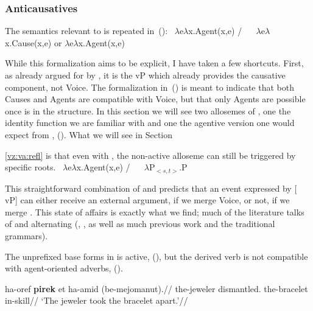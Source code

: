 		\subsubsection{Anticausatives} \label{vz:va:easy:anticaus}
The semantics relevant to {\va} is repeated in~(\nextx):
\pex\label{ex:vz:denote-va}
	\a {} \lra~$\lambda$e$\lambda$x.Agent(x,e) / \trace~\va
	\a {} \lra~$\lambda$e$\lambda$x.Cause(x,e) or $\lambda$e$\lambda$x.Agent(x,e)
\xe

While this formalization aims to be explicit, I have taken a few shortcuts. First, as already argued for by \cite{layering15}, it is the vP which already provides the causative component, not Voice. The formalization in~(\lastx) is meant to indicate that both Causes and Agents are compatible with Voice, but that only Agents are possible once {\va} is in the structure. In this section we will see two allosemes of {\vz}, one the identity function we are familiar with and one the agentive version one would expect from {\va}, (\nextx). What we will see in Section~{\ref{vz:va:refl} is that even with {\va}, the non-active alloseme can still be triggered by specific roots.
\pex 
	\a \denote{\vz} \lra~$\lambda$e$\lambda$x.Agent(x,e) / \trace~\va
	\a \denote{\vz} \lra~$\lambda$P$_{<s,t>}$.P
\xe

This straightforward combination of {\va} and {\vz} predicts that an event expressed by [{\va} vP] can either receive an external argument, if we merge Voice, or not, if we merge {\vz}. This state of affairs is exactly what we find; much of the literature talks of {\tpie} and {\thit} alternating (\citealt{doron03}, \citealt{arad05}, as well as much previous work and the traditional grammars).

The unprefixed base forms in {\tpie} is active, (\nextx), but the derived verb is not compatible with agent-oriented adverbs, (\anextx).

\pex
	\a \begingl
	\gla ha-{\texttslig}oref \textbf{pirek} et ha-{\texttslig}amid (be-mejomanut).//
	\glb the-jeweler dismantled.  the-bracelet in-skill//
	\glft `The jeweler took the bracelet apart.'//
	\endgl
	\a 
\xe

}
